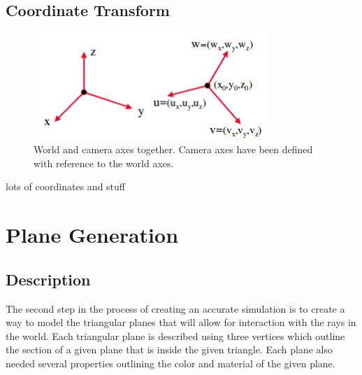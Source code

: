 \documentclass{article}
\begin{document}
\subsection{Coordinate Transform}
\begin{figure}[!t]
\centering
\includegraphics[width=3.5in]{./imgs/axes}
\caption{World and camera axes together. Camera axes have been defined with reference to the world axes.}
\label{fig:axes}
\end{figure}


lots of coordinates and stuff
\section{Plane Generation}
\subsection{Description}
The second step in the process of creating an accurate simulation is to create a way to model the triangular planes
that will allow for interaction with the rays in the world. Each triangular plane is described using three vertices
which outline the section of a given plane that is inside the given triangle. Each plane also needed several properties
outlining the color and material of the given plane.
\end{document}
